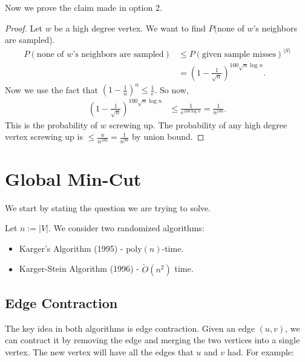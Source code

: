 \documentclass{report}
\begin{document}
Now we prove the claim made in option 2. 
\begin{proof}
    Let $w$ be a high degree vertex. We want to find $P($none of $w$'s neighbors are sampled). 
    \begin{align*}
        P(\text{none of $w$'s neighbors are sampled}) &\leq P(\text{given sample misses})^{|S|} \\ 
        &= \left(1 - \frac{1}{\sqrt n}\right)^{100 \sqrt n \log n}.
    \end{align*}
    Now we use the fact that $\left(1 - \frac 1n\right)^n \leq \frac 1e$. So now,
    \begin{align*}
        \left(1 - \frac{1}{\sqrt n}\right)^{100 \sqrt n \log n} &\leq \frac{1}{e^{100 \log n}} = \frac{1}{n^{100}}.
    \end{align*}
    This is the probability of $w$ screwing up. The probability of any high degree vertex screwing up is $\leq \frac{n}{n^{100}} = \frac{1}{n^{99}}$ by union bound.
\end{proof}
\newpage
\section{Global Min-Cut}
We start by stating the question we are trying to solve.

\noindent Let $n:= |V|$. We consider two randomized algorithms:
\begin{itemize}
    \item Karger's Algorithm (1995) - poly$(n)$-time.
    \item Karger-Stein Algorithm (1996) - $\tilde{O}(n^2)$ time.
\end{itemize}

\subsection{Edge Contraction}
The key idea in both algorithms is edge contraction. Given an edge $(u, v)$, we can contract it by removing the edge and merging the two vertices into a single vertex. The new vertex will have all the edges that $u$ and $v$ had. For example:
\end{document}

